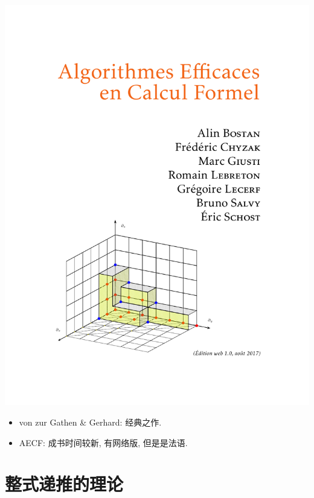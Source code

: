 \documentclass{ctexbeamer}
\begin{document}
\begin{frame}
  \includegraphics[scale=0.25]{AECF.pdf}

  \begin{itemize}
    \item von zur Gathen \& Gerhard: 经典之作.
    \item AECF: 成书时间较新, 有网络版, 但是是法语.
  \end{itemize}

\end{frame}

\section{整式递推的理论}
\end{document}
